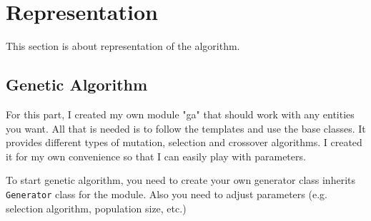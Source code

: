 \documentclass{article}
\begin{document}
\section{Representation}
This section is about representation of the algorithm.
\subsection{Genetic Algorithm}
For this part, I created my own module "ga" that should work with any entities you want. All that is needed is to follow the templates and use the base classes. It provides different types of mutation, selection and crossover algorithms. I created it for my own convenience so that I can easily play with parameters.

To start genetic algorithm, you need to create your own generator class inherits \texttt{Generator} class for the module. Also you need to adjust parameters (e.g. selection algorithm, population size, etc.)
\end{document}
